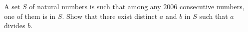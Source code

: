 A set $S$ of natural numbers is such that among any $2006$ consecutive numbers, one of them is in $S$. Show that there exist distinct $a$ and $b$ in $S$ such that $a$ divides $b$.

